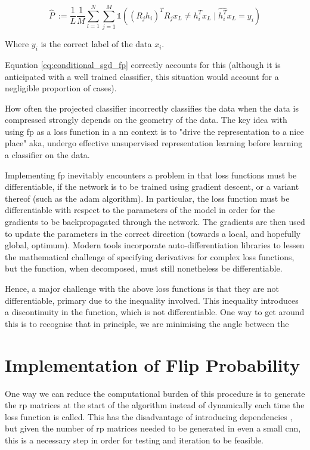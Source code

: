 \begin{equation}
\label{eq:conditional_sgd_fp}
\hat{P}\ := \frac{1}{L}\frac{1}{M}\sum_{l = 1}^N \sum_{j = 1}^M  \mathds{1}( (R_j h_i)^T R_jx_L \neq h_i^Tx_L \mid \hat{h_i^T}x_L = y_i )  
\end{equation}

Where $y_i$ is the correct label of the data $x_i$. 
\bigskip

Equation \ref{eq:conditional_sgd_fp} correctly accounts for this (although it is anticipated with a well trained classifier, this situation would account for a negligible proportion of cases). 
\bigskip

How often the projected classifier incorrectly classifies the data when the data is compressed strongly depends on the  geometry of the data. The key idea with using  \gls{fp} as a loss function in a  \gls{nn} context is to "drive the representation to a nice place" aka, undergo effective unsupervised representation learning before learning a classifier on the data. 
\bigskip


Implementing  \gls{fp} inevitably encounters a problem in that loss functions must be differentiable, if the network is to be trained using gradient descent, or a variant thereof (such as the \gls{adam} algorithm). In particular, the loss function must be differentiable with respect to the parameters of the model in order for the gradients to be backpropagated through the network. The gradients are then used to update the parameters in the correct direction (towards a local, and hopefully global, optimum). Modern tools incorporate auto-differentiation libraries to lessen the mathematical challenge of specifying derivatives for complex loss functions, but the function, when decomposed, must still nonetheless be differentiable.
\bigskip

Hence, a major challenge with the above loss functions is that they are not differentiable, primary due to the inequality involved. This inequality introduces a discontinuity in the function, which is not differentiable. One way to get around this is to recognise that in principle, we are minimising the angle between the 

\section{Implementation of Flip Probability}

One way we can reduce the computational burden of this procedure is to generate the \gls{rp} matrices at the start of the algorithm instead of dynamically each time the loss function is called. This has the disadvantage of introducing dependencies \cite{bob_rp_storage}, but given the number of \gls{rp} matrices needed to be generated in even a small \gls{cnn}, this is a necessary step in order for testing and iteration to be feasible. 
\bigskip

